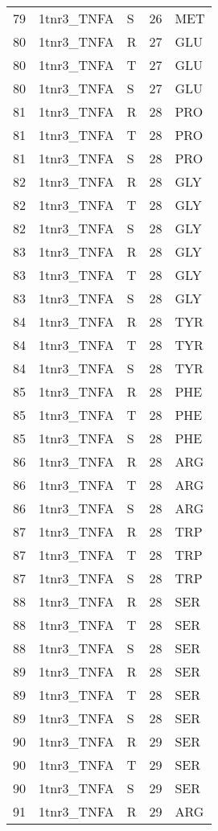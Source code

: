 \begin{tiny}
\begin{longtable}[l]{l|l|l|l|l}
	79 & 1tnr3\_TNFA & S & 26 & MET \\
	80 & 1tnr3\_TNFA & R & 27 & GLU \\
	80 & 1tnr3\_TNFA & T & 27 & GLU \\
	80 & 1tnr3\_TNFA & S & 27 & GLU \\
	81 & 1tnr3\_TNFA & R & 28 & PRO \\
	81 & 1tnr3\_TNFA & T & 28 & PRO \\
	81 & 1tnr3\_TNFA & S & 28 & PRO \\
	82 & 1tnr3\_TNFA & R & 28 & GLY \\
	82 & 1tnr3\_TNFA & T & 28 & GLY \\
	82 & 1tnr3\_TNFA & S & 28 & GLY \\
	83 & 1tnr3\_TNFA & R & 28 & GLY \\
	83 & 1tnr3\_TNFA & T & 28 & GLY \\
	83 & 1tnr3\_TNFA & S & 28 & GLY \\
	84 & 1tnr3\_TNFA & R & 28 & TYR \\
	84 & 1tnr3\_TNFA & T & 28 & TYR \\
	84 & 1tnr3\_TNFA & S & 28 & TYR \\
	85 & 1tnr3\_TNFA & R & 28 & PHE \\
	85 & 1tnr3\_TNFA & T & 28 & PHE \\
	85 & 1tnr3\_TNFA & S & 28 & PHE \\
	86 & 1tnr3\_TNFA & R & 28 & ARG \\
	86 & 1tnr3\_TNFA & T & 28 & ARG \\
	86 & 1tnr3\_TNFA & S & 28 & ARG \\
	87 & 1tnr3\_TNFA & R & 28 & TRP \\
	87 & 1tnr3\_TNFA & T & 28 & TRP \\
	87 & 1tnr3\_TNFA & S & 28 & TRP \\
	88 & 1tnr3\_TNFA & R & 28 & SER \\
	88 & 1tnr3\_TNFA & T & 28 & SER \\
	88 & 1tnr3\_TNFA & S & 28 & SER \\
	89 & 1tnr3\_TNFA & R & 28 & SER \\
	89 & 1tnr3\_TNFA & T & 28 & SER \\
	89 & 1tnr3\_TNFA & S & 28 & SER \\
	90 & 1tnr3\_TNFA & R & 29 & SER \\
	90 & 1tnr3\_TNFA & T & 29 & SER \\
	90 & 1tnr3\_TNFA & S & 29 & SER \\
	91 & 1tnr3\_TNFA & R & 29 & ARG \\

\end{longtable}
\end{tiny}
